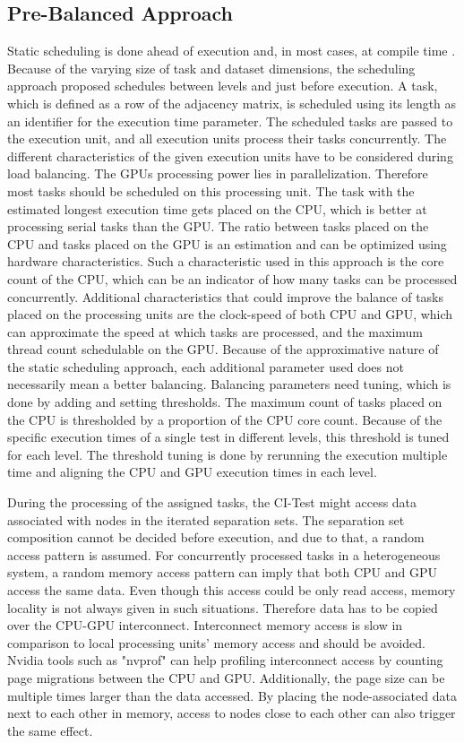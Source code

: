 \subsection{Pre-Balanced Approach}
Static scheduling is done ahead of execution and, in most cases, at compile time \cite{singhSurveyStaticScheduling2015}. Because of the varying size of task and dataset dimensions, the scheduling approach proposed schedules between levels and just before execution. A task, which is defined as a row of the adjacency matrix, is scheduled using its length as an identifier for the execution time parameter. The scheduled tasks are passed to the execution unit, and all execution units process their tasks concurrently. The different characteristics of the given execution units have to be considered during load balancing. The GPUs processing power lies in parallelization. Therefore most tasks should be scheduled on this processing unit. The task with the estimated longest execution time gets placed on the CPU, which is better at processing serial tasks than the GPU. The ratio between tasks placed on the CPU and tasks placed on the GPU is an estimation and can be optimized using hardware characteristics. Such a characteristic used in this approach is the core count of the CPU, which can be an indicator of how many tasks can be processed concurrently. Additional characteristics that could improve the balance of tasks placed on the processing units are the clock-speed of both CPU and GPU, which can approximate the speed at which tasks are processed, and the maximum thread count schedulable on the GPU. Because of the approximative nature of the static scheduling approach, each additional parameter used does not necessarily mean a better balancing. Balancing parameters need tuning, which is done by adding and setting thresholds.
The maximum count of tasks placed on the CPU is thresholded by a proportion of the CPU core count. Because of the specific execution times of a single test in different levels, this threshold is tuned for each level. The threshold tuning is done by rerunning the execution multiple time and aligning the CPU and GPU execution times in each level.

During the processing of the assigned tasks, the CI-Test might access data associated with nodes in the iterated separation sets. The separation set composition cannot be decided before execution, and due to that, a random access pattern is assumed. For concurrently processed tasks in a  heterogeneous system, a random memory access pattern can imply that both CPU and GPU access the same data. Even though this access could be only read access, memory locality is not always given in such situations. Therefore data has to be copied over the CPU-GPU interconnect. Interconnect memory access is slow in comparison to local processing units' memory access and should be avoided. Nvidia tools such as "nvprof" can help profiling interconnect access by counting page migrations between the CPU and GPU. Additionally, the page size can be multiple times larger than the data accessed. By placing the node-associated data next to each other in memory, access to nodes close to each other can also trigger the same effect.

